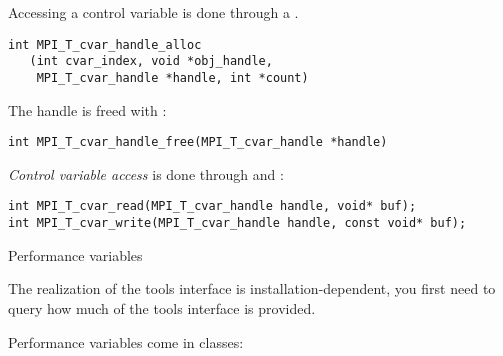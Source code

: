 Accessing a control variable is done through a
.
\begin{lstlisting}
int MPI_T_cvar_handle_alloc
   (int cvar_index, void *obj_handle,
    MPI_T_cvar_handle *handle, int *count)
\end{lstlisting}
The handle is freed with :
\begin{lstlisting}
int MPI_T_cvar_handle_free(MPI_T_cvar_handle *handle)
\end{lstlisting}

\emph{Control variable access}
is done through  and :
\begin{lstlisting}
int MPI_T_cvar_read(MPI_T_cvar_handle handle, void* buf);
int MPI_T_cvar_write(MPI_T_cvar_handle handle, const void* buf);
\end{lstlisting}


 {Performance variables}

The realization of the tools interface is installation-dependent,
you first need to query how much of the tools interface is provided.



\begin{raggedlist}
  Performance variables come in classes:
\end{raggedlist}

